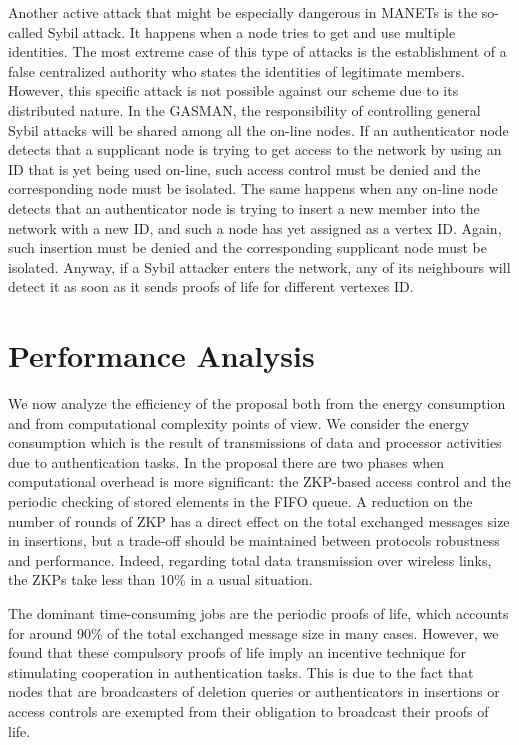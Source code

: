 \documentclass[conference]{IEEEtran}
\begin{document}
Another active attack that might be especially dangerous in MANETs
is the so-called Sybil attack. It happens when a node tries to get
and use multiple identities. The most extreme case of this type of
attacks is the establishment of a false centralized authority who
states the identities of legitimate members. However, this
specific attack is not possible against our scheme due to its
distributed nature. In the GASMAN, the responsibility of
controlling general Sybil attacks will be shared among all the
on-line nodes. If an authenticator  node detects that a supplicant
node is trying to get access to the network by using an
 ID that is yet being used on-line, such access control must be denied and the corresponding node must be isolated. The same happens when any on-line node detects that
an authenticator node is trying to insert a new member into the
network with a new ID, and such a node has yet assigned as a vertex
ID. Again, such insertion must be denied and the corresponding
supplicant node must be isolated. Anyway, if a Sybil attacker
enters the network, any of its neighbours will detect it as soon
as it sends proofs of life for different vertexes ID.


\section{Performance Analysis}
\label{PerformanceAnalysis}
We now analyze the efficiency of the proposal both from the energy
consumption and from computational complexity points of view. We
consider the energy consumption which is the result of
transmissions of data and processor activities due to
authentication tasks. In the proposal there are two phases when
computational overhead is more significant: the ZKP-based access
control and the periodic checking of stored elements in the FIFO queue. A
reduction on the number of rounds of ZKP has a direct effect on
the total exchanged messages size in insertions, but a trade-off
should be maintained between protocols robustness and performance.
Indeed, regarding total data transmission over wireless links, the
ZKPs take less than 10\% in a usual situation.

The dominant time-consuming jobs are the periodic proofs of life, which accounts for around 90\% of the
total exchanged message size in many cases. However, we found
that these compulsory proofs of life imply an incentive technique
for stimulating cooperation in authentication tasks. This is due
to the fact that nodes that are broadcasters of deletion queries or
authenticators in insertions or access controls  are exempted from
their obligation to broadcast their proofs of life.
\end{document}
